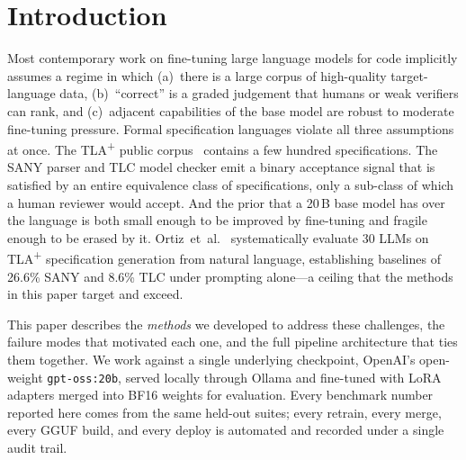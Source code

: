 \documentclass[11pt]{article}
\begin{document}
\section{Introduction}
\label{sec:intro}

Most contemporary work on fine-tuning large language models for code
implicitly assumes a regime in which (a)~there is a large corpus of
high-quality target-language data, (b)~``correct'' is a graded judgement
that humans or weak verifiers can rank, and (c)~adjacent capabilities of
the base model are robust to moderate fine-tuning pressure.  Formal
specification languages violate all three assumptions at once.  The
TLA\textsuperscript{+} public corpus~\cite{lamport2002specifying}
contains a few hundred specifications.  The SANY parser and TLC model
checker emit a binary acceptance signal that is satisfied by an entire
equivalence class of specifications, only a sub-class of which a human
reviewer would accept.  And the prior that a 20\,B base model has over
the language is both small enough to be improved by fine-tuning and
fragile enough to be erased by it.
Ortiz~et~al.~\cite{ortiz2026formallm} systematically evaluate 30 LLMs
on TLA\textsuperscript{+} specification generation from natural
language, establishing baselines of 26.6\% SANY and 8.6\% TLC under
prompting alone---a ceiling that the methods in this paper target and
exceed.

This paper describes the \emph{methods} we developed to address these
challenges, the failure modes that motivated each one, and the full
pipeline architecture that ties them together.  We work against a single
underlying checkpoint, OpenAI's open-weight \texttt{gpt-oss:20b}, served
locally through Ollama and fine-tuned with LoRA adapters merged into
BF16 weights for evaluation.  Every benchmark number reported here comes
from the same held-out suites; every retrain, every merge, every GGUF
build, and every deploy is automated and recorded under a single audit
trail.
\end{document}
